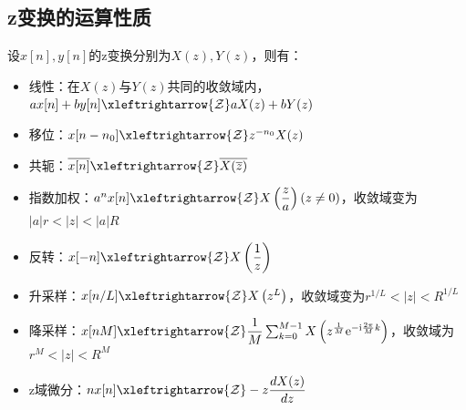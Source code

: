 \documentclass{ctexbook}
\begin{document}
\subsection{z变换的运算性质}\label{sub:z_operation}
\begin{proposition}[z变换的运算性质]
    设$x[n],y[n]$的z变换分别为$X(z),Y(z)$，则有：
    \begin{itemize}
        \item 线性：在$X(z)$与$Y(z)$共同的收敛域内，$a x[n]+b y[n]\xleftrightarrow{\mathcal{Z}} a X(z)+b Y(z)$
        \item 移位：$x[n-n_0]\xleftrightarrow{\mathcal{Z}} z^{-n_0}X(z)$
        \item 共轭：$\overline{x[n]}\xleftrightarrow{\mathcal{Z}} \overline{X(\overline{z})}$
        \item 指数加权：$a^{n} x[n]\xleftrightarrow{\mathcal{Z}} X\left(\dfrac{z}{a}\right)(z\neq 0)$，收敛域变为$|a|r<|z|<|a|R$
        \item 反转：$x[-n]\xleftrightarrow{\mathcal{Z}} X\left(\dfrac{1}{z}\right)$
        \item 升采样：$x[n/L]\xleftrightarrow{\mathcal{Z}} X\left(z^{L}\right)$，收敛域变为$r^{1/L}<|z|<R^{1/L}$
        \item 降采样：$x[nM]\xleftrightarrow{\mathcal{Z}} \dfrac{1}{M}\sum_{k=0}^{M-1}X\left(z^{\frac{1}{M}}\mathrm{e}^{-\mathrm{i}\frac{2\pi}{M}k}\right)$，收敛域为$r^{M}<|z|<R^{M}$
        \item z域微分：$n x[n]\xleftrightarrow{\mathcal{Z}} -z\dfrac{dX(z)}{dz}$
    \end{itemize}
\end{proposition}
\end{document}
